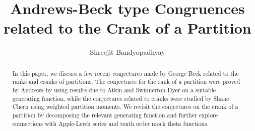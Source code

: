 \documentclass[10pt,reqno]{amsart}
\title{Andrews-Beck type Congruences related to the Crank of a Partition}
\author{Shreejit Bandyopadhyay}
\begin{document}
\maketitle


\begin{abstract}
    In this paper, we discuss a few recent conjectures made by George Beck related to the ranks and cranks of partitions. The conjectures for the rank of a partition were proved by Andrews by using results due to Atkin and Swinnerton-Dyer on a suitable generating function, while the conjectures related to cranks were studied by Shane Chern using weighted partition moments. We revisit the conjectures on the crank of a partition by decomposing the relevant generating function and further explore connections with Apple-Lerch series and tenth order mock theta functions.
\end{abstract}
\end{document}
